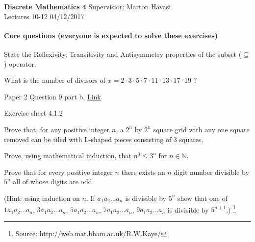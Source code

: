 \documentclass{exam}
\begin{document}
\noindent
\large\textbf{Discrete Mathematics 4} \hfill Supervisior: Marton Havasi \\
\normalsize Lectures 10-12 \hfill 04/12/2017

\paragraph{Core questions (everyone is expected to solve these exercises)}
\begin{questions}
\question State the Reflexivity, Transitivity and Antisymmetry properties of the subset ($\subseteq$) operator.

\question What is the number of divisors of $x=2\cdot 3\cdot 5\cdot 7\cdot 11\cdot 13 \cdot 17 \cdot 19$ ?

 Paper 2 Question 9 part b, \href{http://www.cl.cam.ac.uk/teaching/exams/pastpapers/y2015p2q9.pdf}{Link}

\question Exercise sheet 4.1.2 

Prove that, for any positive integer $n$, a $2^n$ by $2^n$
square grid with any one square removed can be tiled
with L-shaped pieces consisting of 3 squares.

\question Prove, using mathematical induction, that $n^3 \le 3^n$ for $n \in \mathds{N}$.

\question Prove that for every positive integer $n$ there exists an $n$ digit number divisible by $5^n$ all of whose digits are odd. 

(Hint: using induction on $n$. If $a_1a_2 \dots a_n$ is divisible by $5^n$ show that one of $1a_1a_2\dots a_n$, $3a_1a_2\dots a_n$, $5a_1a_2\dots a_n$, $7a_1a_2\dots a_n$, $9a_1a_2\dots a_n$ is divisible by $5^{n+1}$.) \footnote{Source: http://web.mat.bham.ac.uk/R.W.Kaye/}

\end{questions}
\end{document}
